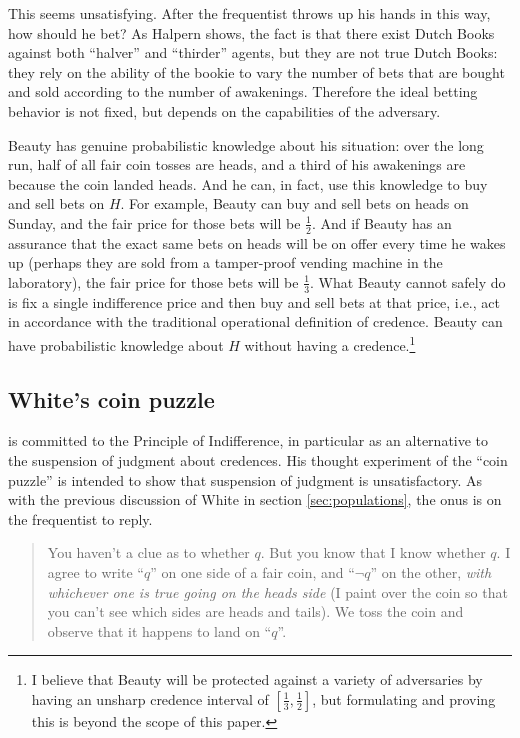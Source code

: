 \documentclass[letterpaper,12pt]{article}
\begin{document}
This seems unsatisfying. After the frequentist throws up his hands in this way, how should he bet? As Halpern shows, the fact is that there exist Dutch Books against both ``halver'' and ``thirder'' agents, but they are not true Dutch Books: they rely on the ability of the bookie to vary the number of bets that are bought and sold according to the number of awakenings. Therefore the ideal betting behavior is not fixed, but depends on the capabilities of the adversary.

Beauty has genuine probabilistic knowledge about his situation: over the long run, half of all fair coin tosses are heads, and a third of his awakenings are because the coin landed heads. And he can, in fact, use this knowledge to buy and sell bets on $H$. For example, Beauty can buy and sell bets on heads on Sunday, and the fair price for those bets will be $\frac{1}{2}$. And if Beauty has an assurance that the exact same bets on heads will be on offer every time he wakes up (perhaps they are sold from a tamper-proof vending machine in the laboratory), the fair price for those bets will be $\frac{1}{3}$. What Beauty cannot safely do is fix a single indifference price and then buy and sell bets at that price, i.e., act in accordance with the traditional operational definition of credence. Beauty can have probabilistic knowledge about $H$ without having a credence.\footnote{I believe that Beauty will be protected against a variety of adversaries by having an unsharp credence interval of $[\frac{1}{3}, \frac{1}{2}]$, but formulating and proving this is beyond the scope of this paper.}

\subsection{White's coin puzzle}
\cite{White2009-WHIESA} is committed to the Principle of Indifference, in particular as an alternative to the suspension of judgment about credences. His thought experiment of the ``coin puzzle'' is intended to show that suspension of judgment is unsatisfactory. As with the previous discussion of White in section \ref{sec:populations}, the onus is on the frequentist to reply.

\begin{quotation}
You haven't a clue as to whether $q$. But you know that I know whether $q$. I agree to write ``$q$'' on one side of a fair coin, and ``$\neg q$'' on the other, \emph{with whichever one is true going on the heads side} (I paint over the coin so that you can't see which sides are heads and tails). We toss the coin and observe that it happens to land on ``$q$''.
\end{quotation}
\end{document}
